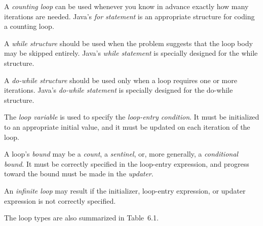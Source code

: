 \begin{BL}
\item  A {\it counting loop} can
be used whenever you know in advance exactly how many iterations are
needed.  Java's {\it for statement} is an appropriate structure for
coding a counting loop.

\item  A {\it while structure} should
be used when the problem suggests that the loop body may be skipped
entirely. Java's {\it while statement} is specially designed for the
while structure.

\item  A {\it do-while structure} should
be used only when a loop requires one or more iterations. Java's
{\it do-while statement} is specially designed for the do-while structure.

\item  The {\it loop variable} is used to specify the
{\it loop-entry condition}. It must be initialized to an appropriate
initial value, and it must be updated on each iteration of the loop.

\item  A loop's {\it bound} may be a {\it count}, a
{\it sentinel}, or, more generally, a {\it conditional bound}.  It
must be correctly specified in the loop-entry expression, and progress
toward the bound must be made in the {\it updater}.

\item  An {\it infinite loop} may result if the
initializer, loop-entry expression, or updater expression is not
correctly specified.
\end{BL}


\noindent The loop types are also summarized in Table~6.1.


